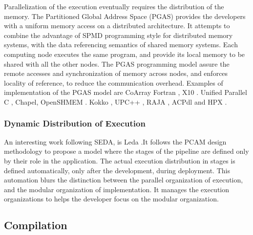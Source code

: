 Parallelization of the execution eventually requires the distribution of the memory.
The Partitioned Global Address Space (PGAS) provides the developers with a uniform memory access on a distributed architecture.
It attempts to combine the advantage of SPMD programming style for distributed memory systems, with the data referencing semantics of shared memory systems.
Each computing node executes the same program, and provide its local memory to be shared with all the other nodes.
The PGAS programming model assure the remote accesses and synchronization of memory across nodes, and enforces locality of reference, to reduce the communication overhead.
Examples of implementation of the PGAS model are 
CoArray Fortran \cite{Numrich1998},
X10 \cite{Charles2005}.
Unified Parallel C \cite{El-Ghazawi2006},
Chapel\cite{Chamberlain2007},
OpenSHMEM \cite{Chapman2010}.
Kokko \cite{Edwards2012},
UPC++ \cite{Zheng2014},
RAJA \cite{Hornung2014},
ACPdl \cite{Ajima2015} and
HPX \cite{Kaiser2015}.






\subsubsection{Dynamic Distribution of Execution}

An interesting work following SEDA, is Leda \cite{Salmito2013,Salmito2014}.It follows the PCAM design methodology \cite{Foster1995} to propose a model where the stages of the pipeline are defined only by their role in the application.
The actual execution distribution in stages is defined automatically, only after the development, during deployment.
This automation blurs the distinction between the parallel organization of execution, and the modular organization of implementation.
It manages the execution organizations to helps the developer focus on the modular organization.





\subsection{Compilation} \label{chapter3:software-maintainability:performance:compilation}

